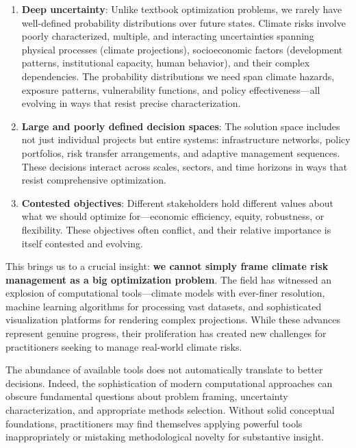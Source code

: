 \documentclass[
  letterpaper,
  DIV=11,
  numbers=noendperiod]{scrreprt}
\providecommand{\tightlist}{%
  \setlength{\itemsep}{0pt}\setlength{\parskip}{0pt}}
\begin{document}
\begin{enumerate}
\def\labelenumi{\arabic{enumi}.}
\tightlist
\item
  \textbf{Deep uncertainty}: Unlike textbook optimization problems, we
  rarely have well-defined probability distributions over future states.
  Climate risks involve poorly characterized, multiple, and interacting
  uncertainties spanning physical processes (climate projections),
  socioeconomic factors (development patterns, institutional capacity,
  human behavior), and their complex dependencies. The probability
  distributions we need span climate hazards, exposure patterns,
  vulnerability functions, and policy effectiveness---all evolving in
  ways that resist precise characterization.
\item
  \textbf{Large and poorly defined decision spaces}: The solution space
  includes not just individual projects but entire systems:
  infrastructure networks, policy portfolios, risk transfer
  arrangements, and adaptive management sequences. These decisions
  interact across scales, sectors, and time horizons in ways that resist
  comprehensive optimization.
\item
  \textbf{Contested objectives}: Different stakeholders hold different
  values about what we should optimize for---economic efficiency,
  equity, robustness, or flexibility. These objectives often conflict,
  and their relative importance is itself contested and evolving.
\end{enumerate}

This brings us to a crucial insight: \textbf{we cannot simply frame
climate risk management as a big optimization problem}. The field has
witnessed an explosion of computational tools---climate models with
ever-finer resolution, machine learning algorithms for processing vast
datasets, and sophisticated visualization platforms for rendering
complex projections. While these advances represent genuine progress,
their proliferation has created new challenges for practitioners seeking
to manage real-world climate risks.

The abundance of available tools does not automatically translate to
better decisions. Indeed, the sophistication of modern computational
approaches can obscure fundamental questions about problem framing,
uncertainty characterization, and appropriate methods selection. Without
solid conceptual foundations, practitioners may find themselves applying
powerful tools inappropriately or mistaking methodological novelty for
substantive insight.
\end{document}
